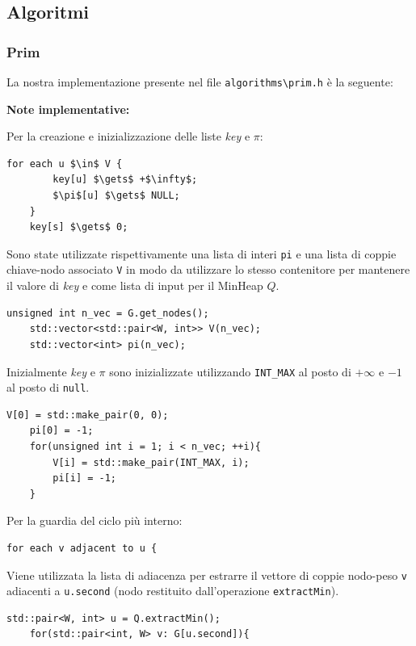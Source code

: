 \documentclass[]{article}
\begin{document}
\subsection{Algoritmi}
\subsubsection{Prim}
\begin{flushleft}
	La nostra implementazione presente nel file \verb|algorithms\prim.h| è la seguente:
	
	\lstset{language=c++, style=mystyle}
	
	
	\textbf{Note implementative:}
	
	\medskip
	Per la creazione e inizializzazione delle liste \textit{key} e $\pi$:
	\begin{lstlisting}[mathescape=true]
	for each u $\in$ V {
		key[u] $\gets$ +$\infty$;
		$\pi$[u] $\gets$ NULL;
	}
	key[s] $\gets$ 0;\end{lstlisting}
	Sono state utilizzate rispettivamente una lista di interi \verb|pi| e una lista di coppie chiave-nodo associato \verb|V| in modo da utilizzare lo stesso contenitore per mantenere il valore di \textit{key} e come lista di input per il MinHeap $Q$.
	\lstset{language=c++, style=mystyle, firstnumber=2}  	 	
	\begin{lstlisting}[mathescape=true]
	unsigned int n_vec = G.get_nodes();
	std::vector<std::pair<W, int>> V(n_vec);
	std::vector<int> pi(n_vec);\end{lstlisting}
	Inizialmente \textit{key} e $\pi$ sono inizializzate utilizzando \verb|INT_MAX| al posto di $+\infty$ e $-1$ al posto di \verb|null|.
	\lstset{language=c++, style=mystyle, firstnumber=5}  	 	
	\begin{lstlisting}[mathescape=true]
	V[0] = std::make_pair(0, 0);
	pi[0] = -1;
	for(unsigned int i = 1; i < n_vec; ++i){
		V[i] = std::make_pair(INT_MAX, i);
		pi[i] = -1;
	}\end{lstlisting}
	
	Per la guardia del ciclo più interno:
	\begin{lstlisting}[mathescape=true]
	for each v adjacent to u {\end{lstlisting}
	Viene utilizzata la lista di adiacenza per estrarre il vettore di coppie nodo-peso \verb|v| adiacenti a \verb|u.second| (nodo restituito dall'operazione \verb|extractMin|).
	\lstset{language=c++, style=mystyle, firstnumber=13}  	 	
	\begin{lstlisting}[mathescape=true]
	std::pair<W, int> u = Q.extractMin();
	for(std::pair<int, W> v: G[u.second]){\end{lstlisting}
	

\end{flushleft}
\end{document}
